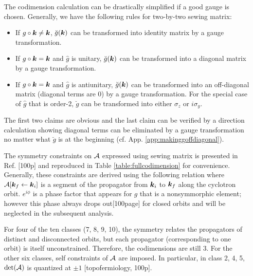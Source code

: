 \documentclass[aps, prb, showpacs, twocolumn, notitlepage, superscriptaddress]{revtex4-1}
\begin{document}
The codimension calculation can be drastically simplified if a good gauge is chosen. Generally, we have the following rules for two-by-two sewing matrix:
\begin{itemize}
\item If $g\circ\boldsymbol{k}\ne\boldsymbol{k}$, $\breve{g}(\boldsymbol{k})$ can be transformed into identity matrix by a gauge transformation.
\item If $g\circ\boldsymbol{k}=\boldsymbol{k}$ and $\hat{g}$ is unitary, $\breve{g}(\boldsymbol{k})$ can be transformed into a diagonal matrix by a gauge transformation.
\item If $g\circ\boldsymbol{k}=\boldsymbol{k}$ and $\hat{g}$ is antiunitary, $\breve{g}(\boldsymbol{k})$ can be transformed into an off-diagonal matrix (diagonal terms are 0) by a gauge transformation.  For the special case of $\hat{g}$ that is order-2, $\breve{g}$ can be transformed into either $\sigma_z$  or $i\sigma_y$.
\end{itemize}
The first two claims are obvious and the last claim can be verified by a direction calculation showing diagonal terms can be eliminated by a gauge transformation no matter what $\breve{g}$ is at the beginning (cf. App. \ref{app:makinggoffdiagonal}).

The symmetry constraints on ${\cal A}$ expressed using sewing matrix is presented in Ref. [100p] and reproduced in Table \ref{table:fullcodimension} for convenience. Generally, these constraints are derived using the following relation
where ${\cal A}[\boldsymbol{k}_f\leftarrow \boldsymbol{k}_i]$ is a segment of the propagator from $\boldsymbol{k}_i$ to $\boldsymbol{k}_f$ along the cyclotron orbit. $e^{i\phi}$ is a phase factor that appears for $g$ that is a nonsymmorphic element; however this phase always drops out[100page] for closed orbits and will be neglected in the subsequent analysis.

For four of  the ten classes (7, 8, 9, 10), the symmetry relates the propagators of distinct and disconnected orbits, but each propagator (corresponding to one orbit) is itself unconstrained.  Therefore, the codimensions are still 3. For the other six classes, self constraints of ${\cal A}$ are imposed. In particular, in class 2, 4, 5, $\det({\cal A})$ is quantized at $\pm 1$ [topofermiology, 100p].
\end{document}
